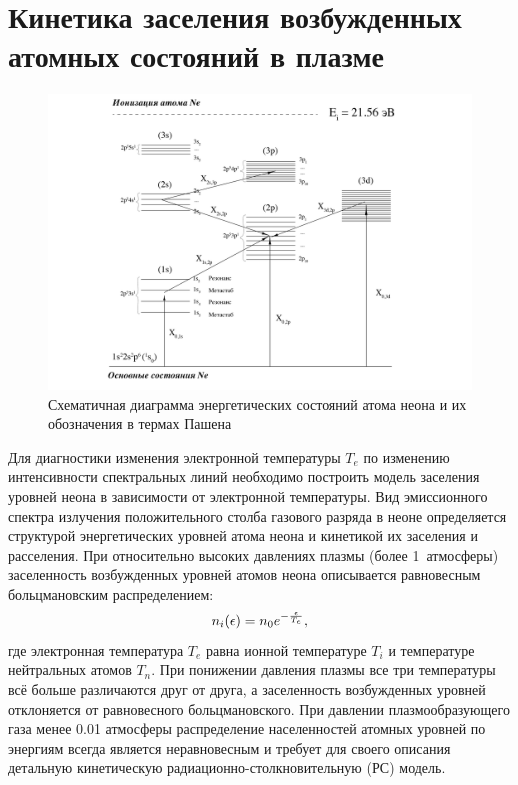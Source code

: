 \section{Кинетика заселения возбужденных атомных состояний в плазме}
\label{sec:kinetika}
\begin{figure}[t]
  \centering
  \includegraphics[width=16cm]{figures/energy_diag_NE}
  \caption{Схематичная диаграмма энергетических состояний атома неона и их обозначения в термах Пашена}
  \label{fig:energy_diag_NE}
\end{figure}
Для диагностики изменения электронной температуры $T_e$ по изменению
интенсивности спектральных линий необходимо построить модель заселения уровней
неона в зависимости от электронной температуры. Вид эмиссионного спектра
излучения положительного столба газового разряда в неоне определяется
структурой энергетических уровней атома неона и кинетикой их заселения и
расселения. При относительно высоких давлениях плазмы (более 1~атмосферы) заселенность
возбужденных уровней атомов неона описывается равновесным больцмановским
распределением:
\begin{equation}
    n_i(\epsilon) = n_0 e^{- {\epsilon \over T_e}},
\end{equation}
где электронная температура $T_e$ равна ионной температуре $T_i$ и температуре
нейтральных атомов $T_n$. При понижении давления плазмы все три температуры всё
больше различаются друг от друга, а заселенность возбужденных уровней
отклоняется от равновесного больцмановского. При давлении плазмообразующего
газа менее 0.01 атмосферы распределение населенностей атомных уровней по
энергиям всегда является неравновесным и требует для своего описания детальную
кинетическую радиационно-столкновительную (РС) модель.

